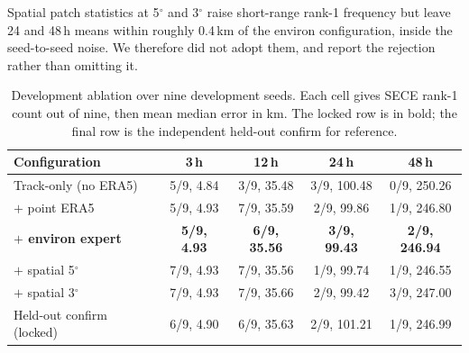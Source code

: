 \documentclass[conference]{IEEEtran}
\newcommand{\sece}{SECE}
\newcommand{\era}{ERA5}
\begin{document}
Spatial patch statistics at 5$^\circ$ and 3$^\circ$ raise short-range rank-1
frequency but leave 24 and 48\,h means within roughly 0.4\,km of the environ
configuration, inside the seed-to-seed noise. We therefore did not adopt them,
and report the rejection rather than omitting it.

\begin{table}[!t]
\caption{Development ablation over nine development seeds. Each cell gives
\sece{} rank-1 count out of nine, then mean median error in km. The locked row is
in bold; the final row is the independent held-out confirm for reference.}
\label{tab:abl}
\centering
\footnotesize
\setlength{\tabcolsep}{3.5pt}
\begin{tabular}{@{}lcccc@{}}
\toprule
Configuration & 3\,h & 12\,h & 24\,h & 48\,h \\
\midrule
Track-only (no \era{})      & 5/9, 4.84 & 3/9, 35.48 & 3/9, 100.48 & 0/9, 250.26 \\
$+$ point \era{}            & 5/9, 4.93 & 7/9, 35.59 & 2/9, \phantom{0}99.86 & 1/9, 246.80 \\
\textbf{$+$ environ expert} & \textbf{5/9, 4.93} & \textbf{6/9, 35.56} & \textbf{3/9, \phantom{0}99.43} & \textbf{2/9, 246.94} \\
$+$ spatial 5$^\circ$       & 7/9, 4.93 & 7/9, 35.56 & 1/9, \phantom{0}99.74 & 1/9, 246.55 \\
$+$ spatial 3$^\circ$       & 7/9, 4.93 & 7/9, 35.66 & 2/9, \phantom{0}99.42 & 3/9, 247.00 \\
\midrule
Held-out confirm (locked)   & 6/9, 4.90 & 6/9, 35.63 & 2/9, 101.21 & 1/9, 246.99 \\
\bottomrule
\end{tabular}
\end{table}
\end{document}
